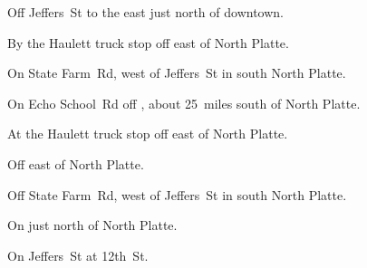 
\begin{LocationList}

Off  Jeffers~St to the east just north of downtown.

\Location{\GarageHQ \Garage}
By the Haulett truck stop off   east of North Platte.

On State Farm~Rd, west of  Jeffers~St in south North Platte.

On Echo School~Rd off , about 25~miles south of North Platte.

At the Haulett truck stop off   east of North Platte.

Off   east of North Platte.

Off State Farm~Rd, west of  Jeffers~St in south North Platte.

On  just north of North Platte.

On  Jeffers~St at  12th~St.

\end{LocationList}
